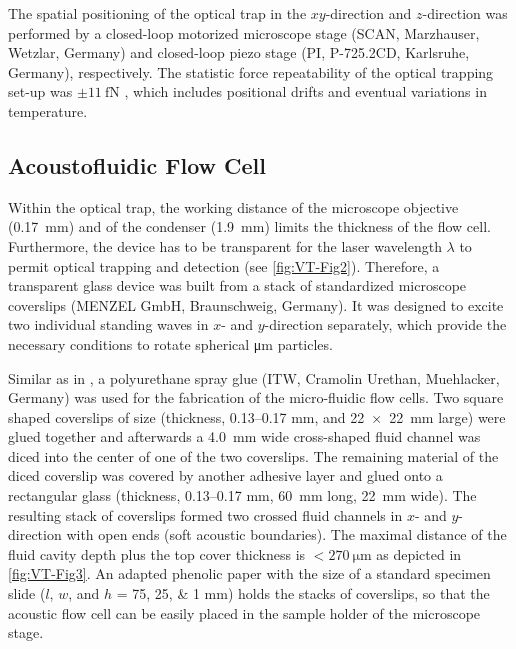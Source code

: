 The spatial positioning of the optical trap in the $xy$-direction and 
$z$-direction was performed by a closed-loop motorized microscope stage (SCAN, 
Marzhauser, Wetzlar, Germany) and closed-loop piezo stage (PI, P-725.2CD, 
Karlsruhe, Germany), respectively. The statistic force repeatability of the 
optical trapping set-up was $\pm \SI{11}{\femto\newton}$ \cite{Lamprecht20132016}, 
which includes positional drifts and eventual variations in temperature.

\subsection{Acoustofluidic Flow Cell\label{sec:VT-DeviceAndAcoustics}}

Within the optical trap, the working distance of the microscope objective 
(\SI{0.17}{\milli\meter}) and of the condenser (\SI{1.9}{\milli\meter}) limits 
the thickness of the flow cell.  Furthermore, the device has to be transparent 
for the laser wavelength $\lambda$ to permit optical trapping and detection (see 
\cref{fig:VT-Fig2}). Therefore, a transparent glass device was built from a stack 
of standardized microscope coverslips (MENZEL GmbH, Braunschweig, Germany). It 
was designed to excite two individual standing waves in $x$- and $y$-direction 
separately, which provide the necessary conditions to rotate spherical 
\si{\micro\meter} particles. 

Similar as in \citeauthor{Lakaemper2015} \cite{Lakaemper2015}, a polyurethane spray glue 
(ITW, Cramolin Urethan, Muehlacker, Germany) was used for the fabrication of the 
micro-fluidic flow cells. Two square shaped coverslips of size (thickness, 
\numrange{0.13}{0.17} \si{\milli\meter}, and \SI{22x22}{\mm} large) were glued 
together and afterwards a \SI{4.0}{\milli\meter} wide cross-shaped fluid channel 
was diced into the center of one of the two coverslips. The remaining material 
of the diced coverslip was covered by another adhesive layer and glued onto a 
rectangular glass (thickness, \numrange{0.13}{0.17} \si{\milli\meter}, 
\SI{60}{\mm} long, \SI{22}{\mm} wide). The resulting stack of coverslips formed 
two crossed fluid channels in $x$- and $y$-direction with open ends (soft 
acoustic boundaries). The maximal distance of the fluid cavity depth plus the 
top cover thickness is $< \SI{270}{\micro\meter}$ as depicted in 
\cref{fig:VT-Fig3}. An adapted phenolic paper with the size of a standard specimen 
slide ($l$, $w$, and $h$ = \numlist{75; 25; 1} \si{\mm}) holds the stacks of 
coverslips, so that the acoustic flow cell can be easily placed in the sample 
holder of the microscope stage.

